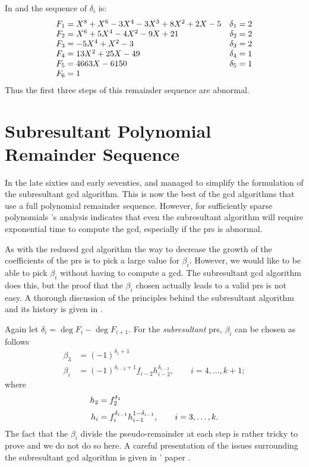 In  and  the sequence of
$\delta_{i}$ is:
\[
\begin{array}[15pt]{lr}
  F_{1} = X^{8}+X^{6} -3X^{4}-3 X^{3} +8 X^{2} + 2 X -5 & \delta_{1} = 2\\
  F_{2} = X^{6}+5 X^{4} - 4 X^{2} -9 X + 21 & \delta_{2} = 2\\
  F_{3} = -5X^{4} + X^{2} - 3 & \delta_{3} = 2\\
  F_{4} = 13 X^{2} + 25 X - 49 & \delta_{4} = 1\\
  F_{5} = 4663 X - 6150 & \delta_{5} = 1 \\
  F_{6} = 1
\end{array}
\]
Thus the first three steps of this remainder sequence are abnormal.

\section{Subresultant Polynomial Remainder Sequence}
\label{Subresultant:PRS:Sec}

In the late sixties and early seventies, {\Collins} and {\BrownWS}
managed to simplify the formulation of the subresultant {\sc gcd}
algorithm.  This is now the best of the {\sc gcd} algorithms that use
a full polynomial remainder sequence.  However, for sufficiently
sparse polynomials {\BrownWS}'s analysis \cite{Brown1978-ef} indicates that
even the subresultant algorithm will require exponential time to
compute the {\sc gcd}, especially if the {\sc prs} is abnormal.

As with the reduced {\sc gcd} algorithm the way to decrease the growth
of the coefficients of the {\sc prs} is to pick a large value for
$\beta_i$.  However, we would like to be able to pick $\beta_i$
without having to compute a {\sc gcd}.  The subresultant {\sc gcd}
algorithm does this, but the proof that the $\beta_i$ chosen actually
leads to a valid {\sc prs} is not easy.  A thorough discussion of the
principles behind the subresultant algorithm and its history is given
in \cite{Loos1982-up}.

Again let $\delta_i = \deg F_{i} - \deg F_{i+1}$.  For the {\em
subresultant} {\sc prs}, $\beta_i$ can be chosen as follows
\[
\begin{aligned}
\beta_3&= (-1)^{\delta_1+1}\\
\beta_i&= (-1)^{\delta_{i-2}+1}f_{i-2}h_{i-2}^{\delta_{i-2}}, 
\qquad i = 4,\ldots, k+1;
\end{aligned}
\]
where
\[
\begin{aligned}
h_2&=f_2^{\delta_1}\\\noalign{\vskip 2pt}
h_i&=f_i^{\delta_{i-1}}h_{i-1}^{1-\delta_{i-1}}, 
\qquad i = 3, \ldots, k.
\end{aligned}
\]
The fact that the $\beta_i$ divide the pseudo-remainder at each step
is rather tricky to prove and we do not do so here.  A careful
presentation of the issues surrounding the subresultant {\sc gcd}
algorithm is given in {\Loos}' paper \cite{Loos1982-up}.

